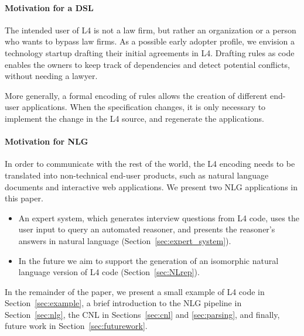 \documentclass[11pt]{article}
\begin{document}
\paragraph{Motivation for a DSL}
The intended user of L4 is not a law firm, but rather an organization or a person who wants to bypass law firms. 
As a possible early adopter profile, we envision a technology startup drafting their initial agreements in L4. Drafting rules as code enables the owners to keep track of dependencies and detect potential conflicts, without needing a lawyer.

More generally, a formal encoding of rules allows the creation of different end-user applications. When the specification changes, it is only necessary to implement the change in the L4 source, and regenerate the applications.

\paragraph{Motivation for NLG}
In order to communicate with the rest of the world, the L4 encoding needs to be translated into non-technical end-user products, such as natural language documents and interactive web applications.
We present two NLG applications in this paper.

\begin{itemize}
    \item An expert system, which generates interview questions from L4 code, uses the user input to query an automated reasoner, and presents the reasoner's answers in natural language (Section~\ref{sec:expert_system}).
    \item In the future we aim to support the generation of an isomorphic natural language version of L4 code (Section~\ref{sec:NLrep}).
\end{itemize}

In the remainder of the paper, we present a small example of L4 code in Section~\ref{sec:example}, 
a brief introduction to the NLG pipeline in Section~\ref{sec:nlg}, 
the CNL in Sections~\ref{sec:cnl} and \ref{sec:parsing}, 
and finally, future work in Section~\ref{sec:futurework}.
\end{document}
